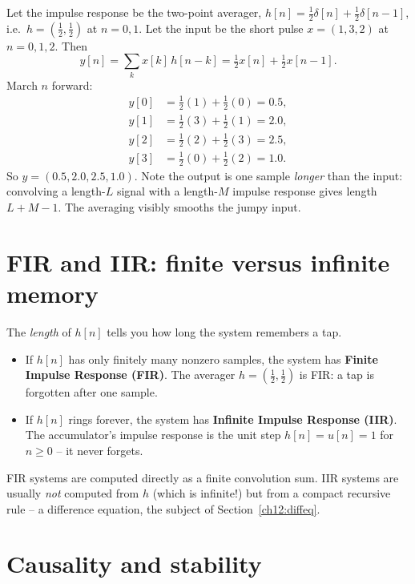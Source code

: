 \begin{example}
\label{ch12:hand-conv}
Let the impulse response be the two-point averager, $h[n] = \tfrac12\delta[n] +
\tfrac12\delta[n-1]$, i.e.\ $h = (\tfrac12, \tfrac12)$ at $n=0,1$. Let the input
be the short pulse $x = (1, 3, 2)$ at $n=0,1,2$. Then
\[
  y[n] = \sum_k x[k]\,h[n-k]
       = \tfrac12 x[n] + \tfrac12 x[n-1].
\]
March $n$ forward:
\[
\begin{aligned}
 y[0] &= \tfrac12(1) + \tfrac12(0) = 0.5,\\
 y[1] &= \tfrac12(3) + \tfrac12(1) = 2.0,\\
 y[2] &= \tfrac12(2) + \tfrac12(3) = 2.5,\\
 y[3] &= \tfrac12(0) + \tfrac12(2) = 1.0.
\end{aligned}
\]
So $y = (0.5, 2.0, 2.5, 1.0)$. Note the output is one sample \emph{longer} than
the input: convolving a length-$L$ signal with a length-$M$ impulse response
gives length $L+M-1$. The averaging visibly smooths the jumpy input.
\end{example}

\section{FIR and IIR: finite versus infinite memory}
\label{ch12:fir-iir}

The \emph{length} of $h[n]$ tells you how long the system remembers a tap.

\begin{itemize}
  \item If $h[n]$ has only finitely many nonzero samples, the system has
        \textbf{Finite Impulse Response (FIR)}. The averager
        $h=(\tfrac12,\tfrac12)$ is FIR: a tap is forgotten after one sample.
  \item If $h[n]$ rings forever, the system has \textbf{Infinite Impulse
        Response (IIR)}. The accumulator's impulse response is the unit step
        $h[n]=u[n]=1$ for $n\ge0$ -- it never forgets.
\end{itemize}

FIR systems are computed directly as a finite convolution sum. IIR systems are
usually \emph{not} computed from $h$ (which is infinite!) but from a compact
recursive rule -- a difference equation, the subject of
Section~\ref{ch12:diffeq}.

\section{Causality and stability}
\label{ch12:causality-stability}

